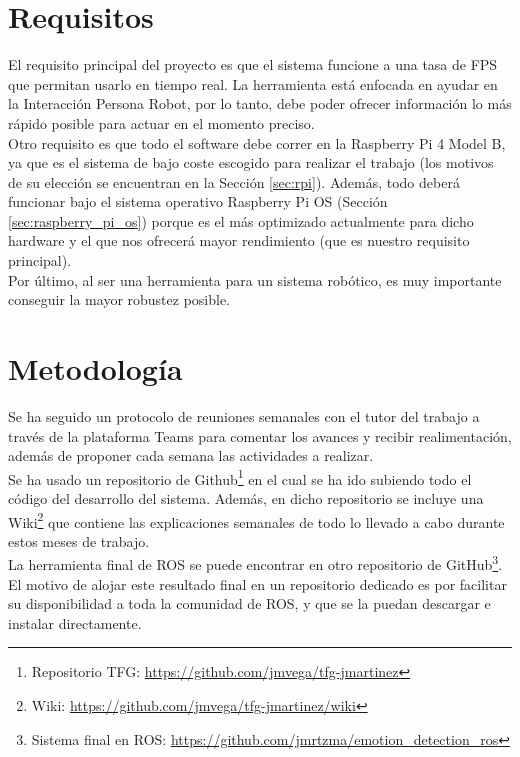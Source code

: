 \section{Requisitos}
\label{sec:requisitos}

El requisito principal del proyecto es que el sistema funcione a una tasa de FPS que permitan usarlo en tiempo real. La herramienta está enfocada en ayudar en la Interacción Persona Robot, por lo tanto, debe poder ofrecer información lo más rápido posible para actuar en el momento preciso.\\

Otro requisito es que todo el software debe correr en la Raspberry Pi 4 Model B, ya que es el sistema de bajo coste escogido para realizar el trabajo (los motivos de su elección se encuentran en la Sección \ref{sec:rpi}). Además, todo deberá funcionar bajo el sistema operativo Raspberry Pi OS (Sección \ref{sec:raspberry_pi_os}) porque es el más optimizado actualmente para dicho hardware y el que nos ofrecerá mayor rendimiento (que es nuestro requisito principal).\\

Por último, al ser una herramienta para un sistema robótico, es muy importante conseguir la mayor robustez posible.

\section{Metodología}
\label{sec:metodologia}

Se ha seguido un protocolo de reuniones semanales con el tutor del trabajo a través de la plataforma Teams para comentar los avances y recibir realimentación, además de proponer cada semana las actividades a realizar.\\

Se ha usado un repositorio de Github\footnote{Repositorio TFG: \url{https://github.com/jmvega/tfg-jmartinez}} en el cual se ha ido subiendo todo el código del desarrollo del sistema. Además, en dicho repositorio se incluye una Wiki\footnote{Wiki: \url{https://github.com/jmvega/tfg-jmartinez/wiki}} que contiene las explicaciones semanales de todo lo llevado a cabo durante estos meses de trabajo.\\

La herramienta final de ROS se puede encontrar en otro repositorio de GitHub\footnote{Sistema final en ROS: \url{https://github.com/jmrtzma/emotion_detection_ros}}. El motivo de alojar este resultado final en un repositorio dedicado es por facilitar su disponibilidad a toda la comunidad de ROS, y que se la puedan descargar e instalar directamente.

